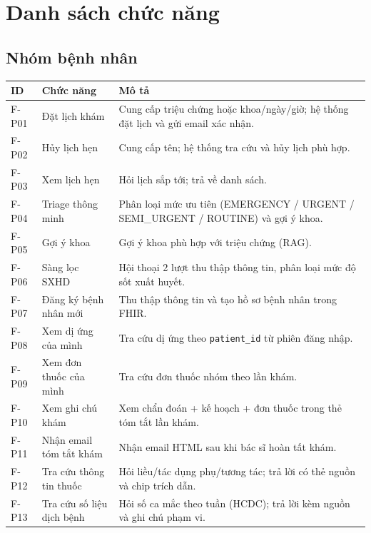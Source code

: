 \documentclass[a4paper,12pt]{article}
\begin{document}
\section{Danh sách chức năng}\label{sec:func}

\subsection{Nhóm bệnh nhân}
\begin{longtable}{|l|p{4cm}|p{8cm}|}
\hline
\textbf{ID} & \textbf{Chức năng} & \textbf{Mô tả} \\ \hline \endhead
F-P01 & Đặt lịch khám & Cung cấp triệu chứng hoặc khoa/ngày/giờ; hệ thống đặt lịch và gửi email xác nhận. \\ \hline
F-P02 & Hủy lịch hẹn & Cung cấp tên; hệ thống tra cứu và hủy lịch phù hợp. \\ \hline
F-P03 & Xem lịch hẹn & Hỏi lịch sắp tới; trả về danh sách. \\ \hline
F-P04 & Triage thông minh & Phân loại mức ưu tiên (EMERGENCY / URGENT / SEMI\_URGENT / ROUTINE) và gợi ý khoa. \\ \hline
F-P05 & Gợi ý khoa & Gợi ý khoa phù hợp với triệu chứng (RAG). \\ \hline
F-P06 & Sàng lọc SXHD & Hội thoại 2 lượt thu thập thông tin, phân loại mức độ sốt xuất huyết. \\ \hline
F-P07 & Đăng ký bệnh nhân mới & Thu thập thông tin và tạo hồ sơ bệnh nhân trong FHIR. \\ \hline
F-P08 & Xem dị ứng của mình & Tra cứu dị ứng theo \texttt{patient\_id} từ phiên đăng nhập. \\ \hline
F-P09 & Xem đơn thuốc của mình & Tra cứu đơn thuốc nhóm theo lần khám. \\ \hline
F-P10 & Xem ghi chú khám & Xem chẩn đoán + kế hoạch + đơn thuốc trong thẻ tóm tắt lần khám. \\ \hline
F-P11 & Nhận email tóm tắt khám & Nhận email HTML sau khi bác sĩ hoàn tất khám. \\ \hline
F-P12 & Tra cứu thông tin thuốc & Hỏi liều/tác dụng phụ/tương tác; trả lời có thẻ nguồn và chip trích dẫn. \\ \hline
F-P13 & Tra cứu số liệu dịch bệnh & Hỏi số ca mắc theo tuần (HCDC); trả lời kèm nguồn và ghi chú phạm vi. \\ \hline
\end{longtable}
\end{document}
